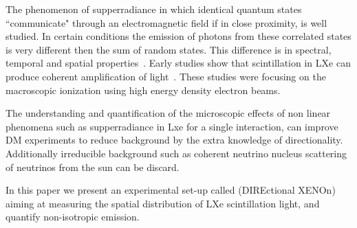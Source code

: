 The phenomenon of supperradiance in which identical quantum states ``communicate" through an electromagnetic field if in close proximity, 
is well studied. In certain conditions the emission of photons from these correlated states is very different then the sum of random states. 
This difference is in spectral, temporal and spatial properties~\cite{DickeSR,GROSS1982301}. Early studies show that scintillation in LXe can 
produce coherent amplification of light~\cite{BasovSRTheory,MiesSRExp}. These studies were focusing on the macroscopic ionization using high 
energy density electron beams. 

The understanding and quantification of the microscopic effects of non linear phenomena such as supperradiance in Lxe for a single interaction, 
can improve DM experiments to reduce background by the extra knowledge of directionality. Additionally irreducible background such as coherent neutrino nucleus scattering of neutrinos from the sun can be discard.

In this paper we present an experimental set-up called \direxeno (DIREctional XENOn) aiming at measuring the spatial distribution of LXe scintillation 
light, and quantify non-isotropic emission.   

